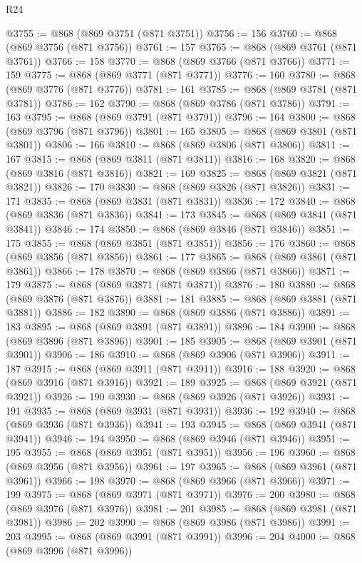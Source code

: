 \begin{lexlean}{R24}
\begin{coremodule}
@3755 := @868 (@869 @3751 (@871 @3751))
@3756 := 156
@3760 := @868 (@869 @3756 (@871 @3756))
@3761 := 157
@3765 := @868 (@869 @3761 (@871 @3761))
@3766 := 158
@3770 := @868 (@869 @3766 (@871 @3766))
@3771 := 159
@3775 := @868 (@869 @3771 (@871 @3771))
@3776 := 160
@3780 := @868 (@869 @3776 (@871 @3776))
@3781 := 161
@3785 := @868 (@869 @3781 (@871 @3781))
@3786 := 162
@3790 := @868 (@869 @3786 (@871 @3786))
@3791 := 163
@3795 := @868 (@869 @3791 (@871 @3791))
@3796 := 164
@3800 := @868 (@869 @3796 (@871 @3796))
@3801 := 165
@3805 := @868 (@869 @3801 (@871 @3801))
@3806 := 166
@3810 := @868 (@869 @3806 (@871 @3806))
@3811 := 167
@3815 := @868 (@869 @3811 (@871 @3811))
@3816 := 168
@3820 := @868 (@869 @3816 (@871 @3816))
@3821 := 169
@3825 := @868 (@869 @3821 (@871 @3821))
@3826 := 170
@3830 := @868 (@869 @3826 (@871 @3826))
@3831 := 171
@3835 := @868 (@869 @3831 (@871 @3831))
@3836 := 172
@3840 := @868 (@869 @3836 (@871 @3836))
@3841 := 173
@3845 := @868 (@869 @3841 (@871 @3841))
@3846 := 174
@3850 := @868 (@869 @3846 (@871 @3846))
@3851 := 175
@3855 := @868 (@869 @3851 (@871 @3851))
@3856 := 176
@3860 := @868 (@869 @3856 (@871 @3856))
@3861 := 177
@3865 := @868 (@869 @3861 (@871 @3861))
@3866 := 178
@3870 := @868 (@869 @3866 (@871 @3866))
@3871 := 179
@3875 := @868 (@869 @3871 (@871 @3871))
@3876 := 180
@3880 := @868 (@869 @3876 (@871 @3876))
@3881 := 181
@3885 := @868 (@869 @3881 (@871 @3881))
@3886 := 182
@3890 := @868 (@869 @3886 (@871 @3886))
@3891 := 183
@3895 := @868 (@869 @3891 (@871 @3891))
@3896 := 184
@3900 := @868 (@869 @3896 (@871 @3896))
@3901 := 185
@3905 := @868 (@869 @3901 (@871 @3901))
@3906 := 186
@3910 := @868 (@869 @3906 (@871 @3906))
@3911 := 187
@3915 := @868 (@869 @3911 (@871 @3911))
@3916 := 188
@3920 := @868 (@869 @3916 (@871 @3916))
@3921 := 189
@3925 := @868 (@869 @3921 (@871 @3921))
@3926 := 190
@3930 := @868 (@869 @3926 (@871 @3926))
@3931 := 191
@3935 := @868 (@869 @3931 (@871 @3931))
@3936 := 192
@3940 := @868 (@869 @3936 (@871 @3936))
@3941 := 193
@3945 := @868 (@869 @3941 (@871 @3941))
@3946 := 194
@3950 := @868 (@869 @3946 (@871 @3946))
@3951 := 195
@3955 := @868 (@869 @3951 (@871 @3951))
@3956 := 196
@3960 := @868 (@869 @3956 (@871 @3956))
@3961 := 197
@3965 := @868 (@869 @3961 (@871 @3961))
@3966 := 198
@3970 := @868 (@869 @3966 (@871 @3966))
@3971 := 199
@3975 := @868 (@869 @3971 (@871 @3971))
@3976 := 200
@3980 := @868 (@869 @3976 (@871 @3976))
@3981 := 201
@3985 := @868 (@869 @3981 (@871 @3981))
@3986 := 202
@3990 := @868 (@869 @3986 (@871 @3986))
@3991 := 203
@3995 := @868 (@869 @3991 (@871 @3991))
@3996 := 204
@4000 := @868 (@869 @3996 (@871 @3996))

\end{coremodule}
\end{lexlean}

